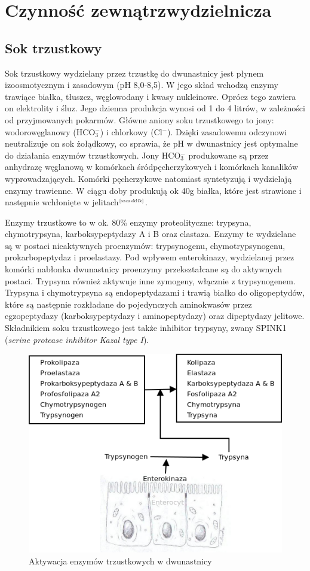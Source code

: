 \documentclass[a4paper, 12pt]{report}
\newcommand\cyt[1]{$^{\tiny{\cite{#1}}}$}
\begin{document}
\section{Czynność zewnątrzwydzielnicza}
\subsection{Sok trzustkowy}
Sok trzustkowy wydzielany przez trzustkę do dwunastnicy jest płynem
izoosmotycznym i zasadowym (pH 8,0-8,5). W jego skład wchodzą enzymy
trawiące białka, tłuszcz, węglowodany i kwasy nukleinowe. Oprócz tego
zawiera on elektrolity i śluz. Jego dzienna produkcja wynosi od 1 do 4
litrów, w zależności od przyjmowanych pokarmów. Główne aniony soku
trzustkowego to jony: wodorowęglanowy (HCO$_3^-$) i chlorkowy
(Cl$^-$). Dzięki zasadowemu odczynowi neutralizuje on sok żołądkowy, 
co sprawia, że pH w dwunastnicy jest optymalne do działania enzymów
trzustkowych. Jony HCO$_3^-$ produkowane są przez anhydrazę węglanową
w komórkach śródpęcherzykowych i komórkach kanalików wyprowadzających.
Komórki pęcherzykowe natomiast syntetyzują i wydzielają enzymy
trawienne. W ciągu doby produkują ok 40g białka, które jest strawione
i następnie wchłonięte w jelitach\cyt{szczeklik}.

Enzymy trzustkowe to w ok. 80\% enzymy proteolityczne: trypsyna,
chymotrypsyna, karboksypeptydazy A i B oraz elastaza. Enzymy te
wydzielane są w postaci nieaktywnych proenzymów: trypsynogenu, chymotrypsynogenu,
prokarbopeptydaz i proelastazy. Pod wpływem enterokinazy, wydzielanej
przez komórki nabłonka dwunastnicy proenzymy przekształcane są do
aktywnych postaci. Trypsyna również aktywuje inne zymogeny, włącznie z
trypsynogenem. Trypsyna i chymotrypsyna są endopeptydazami i
trawią białko do oligopeptydów, które są następnie rozkładane do
pojedynczych aminokwasów przez egzopeptydazy (karboksypeptydazy i
aminopeptydazy) oraz dipeptydazy jelitowe. Składnikiem soku
trzustkowego jest także inhibitor trypsyny, zwany SPINK1
(\textsl{serine protease inhibitor Kazal type I}).

\begin{figure}[!h]
\centering
\includegraphics[scale=0.4]{pan-enz}
\caption{Aktywacja enzymów trzustkowych w dwunastnicy}
\end{figure}
\end{document}
